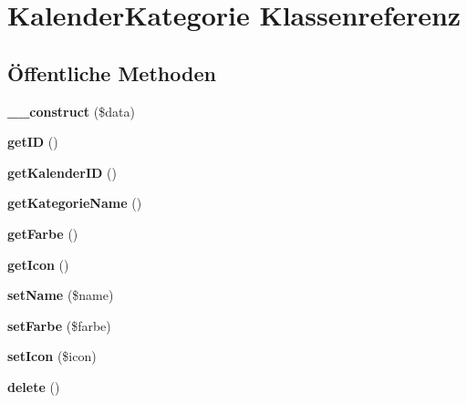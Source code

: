 \hypertarget{class_kalender_kategorie}{}\section{Kalender\+Kategorie Klassenreferenz}
\label{class_kalender_kategorie}
\subsection*{Öffentliche Methoden}
\begin{DoxyCompactItemize}
\item 
\mbox{\label{class_kalender_kategorie_a0fc7eba3acb213c1f8c0e43c225c1c30}} 
{\bfseries \+\_\+\+\_\+construct} (\$data)
\item 
\mbox{\label{class_kalender_kategorie_afa04bedf7995d03f5fd344b8af814044}} 
{\bfseries get\+ID} ()
\item 
\mbox{\label{class_kalender_kategorie_aa6c7af9011ef5222bf74f9248d152269}} 
{\bfseries get\+Kalender\+ID} ()
\item 
\mbox{\label{class_kalender_kategorie_a29858ab3f97fdb8c10eb84d51ed7c8d0}} 
{\bfseries get\+Kategorie\+Name} ()
\item 
\mbox{\label{class_kalender_kategorie_a5a8a79e3b777e5615656274c644363af}} 
{\bfseries get\+Farbe} ()
\item 
\mbox{\label{class_kalender_kategorie_a198bc50f322b35a6b99471bb6ea9e76b}} 
{\bfseries get\+Icon} ()
\item 
\mbox{\label{class_kalender_kategorie_ad14ebba12078e5c554b0d75225de9025}} 
{\bfseries set\+Name} (\$name)
\item 
\mbox{\label{class_kalender_kategorie_a296c13d03ae022572e449291a4895cc7}} 
{\bfseries set\+Farbe} (\$farbe)
\item 
\mbox{\label{class_kalender_kategorie_afac6504c539efbcf0a9e4ec58ef573bc}} 
{\bfseries set\+Icon} (\$icon)
\item 
\mbox{\label{class_kalender_kategorie_aff422f13a0cd4f712c390c5f2afb33bf}} 
{\bfseries delete} ()
\end{DoxyCompactItemize}
